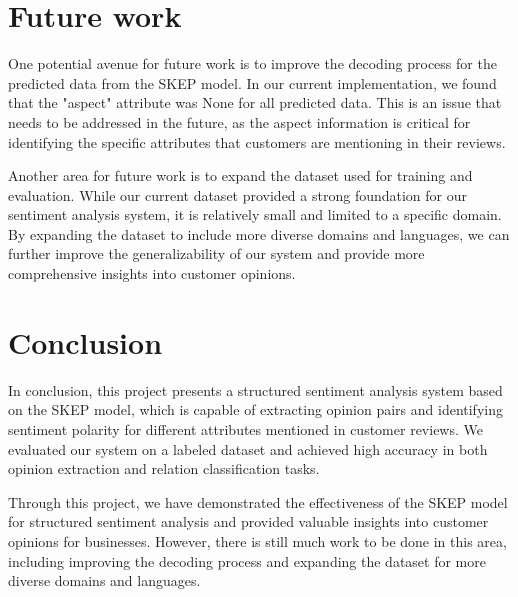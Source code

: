 \section{Future work}

One potential avenue for future work is to improve the decoding process for the predicted data from the SKEP model. In our current implementation, we found that the "aspect" attribute was None for all predicted data. This is an issue that needs to be addressed in the future, as the aspect information is critical for identifying the specific attributes that customers are mentioning in their reviews.

Another area for future work is to expand the dataset used for training and evaluation. While our current dataset provided a strong foundation for our sentiment analysis system, it is relatively small and limited to a specific domain. By expanding the dataset to include more diverse domains and languages, we can further improve the generalizability of our system and provide more comprehensive insights into customer opinions.

\section{Conclusion}

In conclusion, this project presents a structured sentiment analysis system based on the SKEP model, which is capable of extracting opinion pairs and identifying sentiment polarity for different attributes mentioned in customer reviews. We evaluated our system on a labeled dataset and achieved high accuracy in both opinion extraction and relation classification tasks.

Through this project, we have demonstrated the effectiveness of the SKEP model for structured sentiment analysis and provided valuable insights into customer opinions for businesses. However, there is still much work to be done in this area, including improving the decoding process and expanding the dataset for more diverse domains and languages.